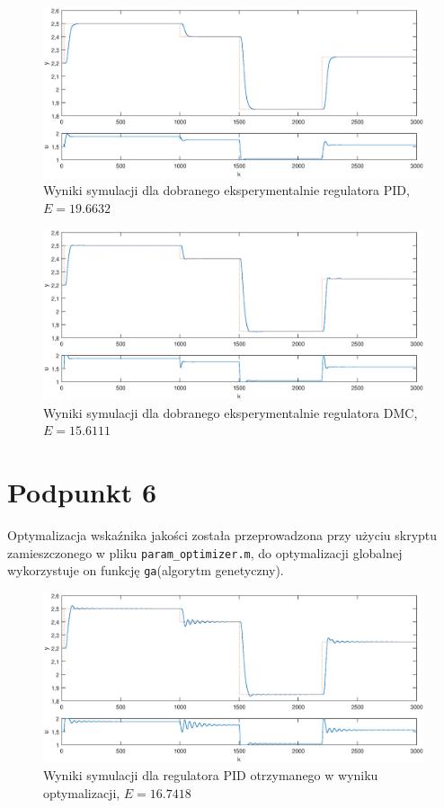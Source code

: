\begin{figure}[ht]
\centering
\includegraphics[scale=1]{images/Z5manualPID}
\caption{Wyniki symulacji dla dobranego eksperymentalnie regulatora PID, $E=\num{19,6632}$}
\label{Z5manualPID}
\end{figure}


\begin{figure}[ht]
\centering
\includegraphics[scale=1]{images/Z5manualDMC}
\caption{Wyniki symulacji dla dobranego eksperymentalnie regulatora DMC, $E=\num{15,6111}$}
\label{Z5manualDMC}
\end{figure}

\chapter{Podpunkt 6}
Optymalizacja wskaźnika jakości została przeprowadzona przy użyciu skryptu zamieszczonego w pliku \verb+param_optimizer.m+, do optymalizacji globalnej wykorzystuje on funkcję \verb+ga+(algorytm genetyczny).


\begin{figure}[ht]
\centering
\includegraphics[scale=1]{images/Z6optimizedPID}
\caption{Wyniki symulacji dla regulatora PID otrzymanego w wyniku optymalizacji, $E=\num{16,7418}$}
\label{Z6optimizedPID}
\end{figure}


